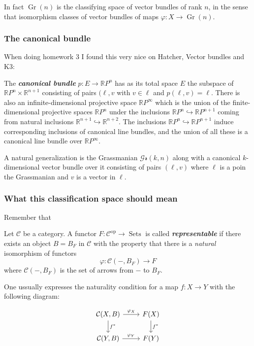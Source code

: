\begin{remark}
	In fact $\operatorname{Gr}(n)$ is the classifying space of vector bundles of rank $n$, in the sense that isomorphism classes of vector bundles of maps $\varphi:X\to \operatorname{Gr}(n)$.
\end{remark}

\subsubsection{The canonical bundle}

When doing homework 3 I found this very nice on Hatcher, Vector bundles and K3:

\begin{defn}
	The \textit{\textbf{canonical bundle}} $p:E\to \mathbb{R}P^{n}$ has as its total space $E$ the subspace of $\mathbb{R}P^{n}\times \mathbb{R}^{n+1}$ consisting of pairs $(\ell,v$ with $v\in\ell$ and $p(\ell,v)=\ell$. There is also an infinite-dimensional projective space $\mathbb{R}P^{\infty}$ which is the union of the finite-dimensional projective spaces $\mathbb{R}P^{n}$ under the inclusions $\mathbb{R}P^{n}\hookrightarrow \mathbb{R}P^{n+1}$ coming from natural inclusions $\mathbb{R}^{n+1}\hookrightarrow \mathbb{R}^{n+2}$. The inclusions $\mathbb{R}P^{n}\hookrightarrow \mathbb{R}P^{n+1}$ induce corresponding inclusions of canonical line bundles, and the union of all these is a canonical line bundle over $\mathbb{R}P^{\infty}$.

	A natural generalization is the Grassmanian $\mathcal{Gr}(k,n)$ along with a canonical $k$-dimensional vector bundle over it consisting of pairs $(\ell,v)$ where $\ell$ is a poin the Grassmanian and  $v$ is a vector in $\ell$.
\end{defn}

\subsubsection{What this classification space should mean}

Remember that
\begin{defn}
	Let $\mathcal{C}$ be a category. A functor $F:\mathcal{C}^{\operatorname{op}}\to \operatorname{Sets}$ is called \textit{\textbf{representable}} if there exists an object $B=B_{F}$ in $\mathcal{C}$ with the property that there is a \textit{natural} isomorphism of functors
	\[\varphi:\mathcal{C}(-,B_{F})\to F\]
	where $\mathcal{C}(-,B_{F})$ is the set of arrows from $-$ to $B_{F}$.

	One ussually expresses the naturality condition for a map $f:X\to Y$ with the following diagram:

	\[\begin{tikzcd}
		\mathcal{C}(X,B)\arrow[r,"\varphi_{X}"]\arrow[d,"f^{*}"]&F(X)\arrow[d,"f^{*}"]\\
		\mathcal{C}(Y,B)\arrow[r,"\varphi_{Y}"]&F(Y)
	\end{tikzcd}\]
\end{defn}

